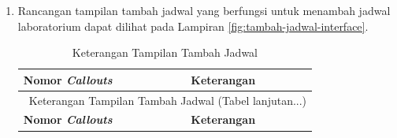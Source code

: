 \begin{enumerate}
	\item Rancangan tampilan tambah jadwal yang berfungsi untuk menambah jadwal laboratorium dapat dilihat pada Lampiran \ref{fig:tambah-jadwal-interface}.



	      {
	      \fontsize{10}{13}\selectfont
	      \begin{longtable}{p{4cm} p{9cm}}
		      \caption{Keterangan Tampilan Tambah Jadwal}
		      \label{tab:tambah-jadwal}                                                                                                                                                                                          \\
		      \hline
		      \textbf{Nomor \textit{Callouts}} & \textbf{Keterangan}                                                                                                                                                             \\
		      \hline
		      \endfirsthead

		      \multicolumn{2}{c}{\selectfont \thetable\ {Keterangan Tampilan Tambah Jadwal} \space (Tabel lanjutan...)}                                                                                                          \\
		      \hline
		      \textbf{Nomor \textit{Callouts}} & \textbf{Keterangan}                                                                                                                                                             \\
		      \hline
		      \endhead


\end{longtable}}
\end{enumerate}
